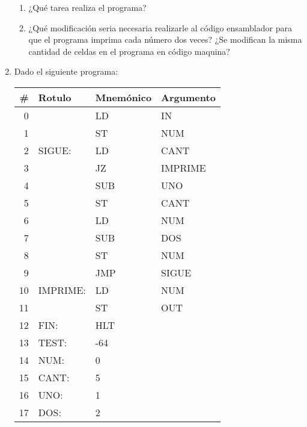\documentclass[12pt]{article}
\begin{document}
\begin{enumerate}
\begin{tabular}{|r||l|l|l||c|}
        \end{tabular}

        \begin{enumerate}

            \item ¿Qué tarea realiza el programa?

            \item ¿Qué modificación seria necesaria realizarle al código
                ensamblador para que el programa imprima cada número dos
                veces? ¿Se modifican la misma cantidad de celdas en el
                programa en código maquina?

        \end{enumerate}

    \item Dado el siguiente programa:

        \begin{tabular}{|r||l|l|l|}

            \hline

            \textbf{\#} & \textbf{Rotulo} & \textbf{Mnemónico} &
            \textbf{Argumento}\\
            \hline
            \hline

            0 & & LD & IN\\ \hline
            1 & & ST & NUM\\ \hline
            2 & SIGUE: & LD & CANT\\ \hline
            3 & & JZ & IMPRIME\\ \hline
            4 & & SUB & UNO\\ \hline
            5 & & ST & CANT\\ \hline
            6 & & LD & NUM\\ \hline
            7 & & SUB & DOS\\ \hline
            8 & & ST & NUM\\ \hline
            9 & & JMP & SIGUE\\ \hline
            10 & IMPRIME: & LD & NUM\\ \hline
            11 & & ST & OUT\\ \hline
            12 & FIN: & HLT & \\ \hline
            13 & TEST: & -64 & \\ \hline
            14 & NUM: & 0 & \\ \hline
            15 & CANT: & 5 & \\ \hline
            16 & UNO: & 1 & \\ \hline
            17 & DOS: & 2 & \\ \hline


\end{tabular}
\end{enumerate}
\end{document}
